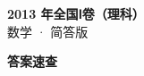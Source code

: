 \documentclass[zihao=-4, a4paper]{ctexart}
\begin{document}
\begin{center}
  {\Large\bfseries 2013 年全国Ⅰ卷（理科）}\\[4pt]
  {\large 数学 · 简答版}
\end{center}
\medskip
{}

\clearpage
{}
\begin{center}{\Large\bfseries 答案速查}\end{center}
\medskip

\end{document}

